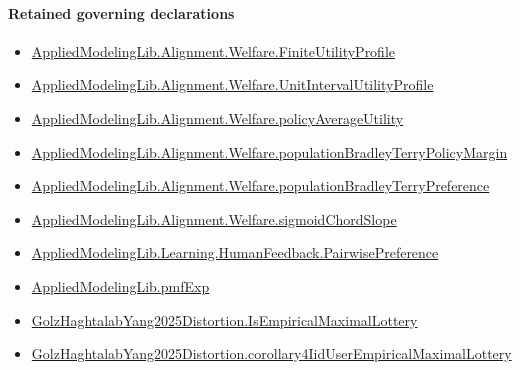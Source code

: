 \documentclass[10pt]{article}
\begin{document}
\paragraph{Retained governing declarations}
\begin{itemize}\raggedright
\item \hyperlink{library-prerequisite-56c0734f8877ddbe}{Applied\allowbreak{}Modeling\allowbreak{}Lib.\allowbreak{}Alignment.\allowbreak{}Welfare.\allowbreak{}Finite\allowbreak{}Utility\allowbreak{}Profile}
\item \hyperlink{library-prerequisite-cbe8afa0d6d1ba78}{Applied\allowbreak{}Modeling\allowbreak{}Lib.\allowbreak{}Alignment.\allowbreak{}Welfare.\allowbreak{}Unit\allowbreak{}Interval\allowbreak{}Utility\allowbreak{}Profile}
\item \hyperlink{library-prerequisite-184c74a4db4311c2}{Applied\allowbreak{}Modeling\allowbreak{}Lib.\allowbreak{}Alignment.\allowbreak{}Welfare.\allowbreak{}policy\allowbreak{}Average\allowbreak{}Utility}
\item \hyperlink{governing-declaration-5c3611f5a76c4e77}{Applied\allowbreak{}Modeling\allowbreak{}Lib.\allowbreak{}Alignment.\allowbreak{}Welfare.\allowbreak{}population\allowbreak{}Bradley\allowbreak{}Terry\allowbreak{}Policy\allowbreak{}Margin}
\item \hyperlink{library-prerequisite-cf06d15d7f8b7c31}{Applied\allowbreak{}Modeling\allowbreak{}Lib.\allowbreak{}Alignment.\allowbreak{}Welfare.\allowbreak{}population\allowbreak{}Bradley\allowbreak{}Terry\allowbreak{}Preference}
\item \hyperlink{governing-declaration-a4d623b8c608b566}{Applied\allowbreak{}Modeling\allowbreak{}Lib.\allowbreak{}Alignment.\allowbreak{}Welfare.\allowbreak{}sigmoid\allowbreak{}Chord\allowbreak{}Slope}
\item \hyperlink{library-prerequisite-7e2db20cf087d9ba}{Applied\allowbreak{}Modeling\allowbreak{}Lib.\allowbreak{}Learning.\allowbreak{}Human\allowbreak{}Feedback.\allowbreak{}Pairwise\allowbreak{}Preference}
\item \hyperlink{governing-declaration-8e4b4389a4f6454b}{Applied\allowbreak{}Modeling\allowbreak{}Lib.\allowbreak{}pmf\allowbreak{}Exp}
\item \hyperlink{paper-prerequisite-53af1666fc341b0f}{Golz\allowbreak{}Haghtalab\allowbreak{}Yang2025\allowbreak{}Distortion.\allowbreak{}Is\allowbreak{}Empirical\allowbreak{}Maximal\allowbreak{}Lottery}
\item \hyperlink{paper-prerequisite-54cac251e94c8e83}{Golz\allowbreak{}Haghtalab\allowbreak{}Yang2025\allowbreak{}Distortion.\allowbreak{}corollary4\allowbreak{}Iid\allowbreak{}User\allowbreak{}Empirical\allowbreak{}Maximal\allowbreak{}Lottery}

\end{itemize}
\end{document}
